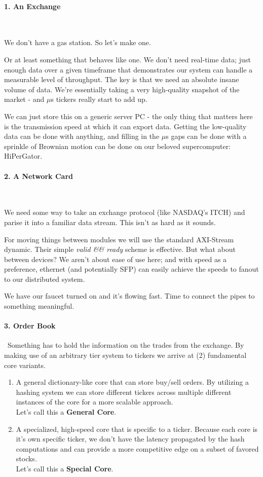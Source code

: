 \documentclass[12pt]{article}
\begin{document}
\paragraph {1. An Exchange}\

We don't have a gas station. So let's make one.

Or at least something that behaves like one. We don't need real-time data; just enough data over a given timeframe that demonstrates our system can handle a measurable level of throughput. The key is that we need an absolute insane volume of data. We're essentially taking a very high-quality snapshot of the market - and $\mu$s tickers really start to add up.

We can just store this on a generic server PC - the only thing that matters here is the transmission speed at which it can export data. 
Getting the low-quality data can be done with anything, and filling in the $\mu$s gaps can be done with a sprinkle of Brownian motion can be done on our
beloved supercomputer: HiPerGator.

\paragraph {2. A Network Card}\

We need some way to take an exchange protocol (like NASDAQ's ITCH) and parise it into a familiar data stream. This isn't as hard as it sounds.

For moving things between modules we will use the standard AXI-Stream dynamic. Their simple \emph{valid \&\& ready} scheme is effective.
But what about between devices? 
We aren't about ease of use here; and with speed as a preference, ethernet (and potentially SFP) can
easily achieve the speeds to fanout to our distributed system.

We have our faucet turned on and it's flowing fast. Time to connect the pipes to something meaningful.

\paragraph {3. Order Book}\ 
Something has to hold the information on the trades from the exchange.
By making use of an arbitrary tier system to tickers we arrive at (2) fundamental core variants.

\begin{enumerate}
  \item 
A general dictionary-like core that can store buy/sell orders. 
By utilizing a hashing system we can store different tickers across multiple 
different instances of the core for a more scalable approach.\\
Let's call this a \textbf{General Core}.

  \item 
A specialized, high-speed core that is specific to a ticker. 
Because each core is it's own specific ticker, we don't have the latency 
propagated by the hash computations and can provide a more competitive edge on a subset of favored stocks.\\
Let's call this a \textbf{Special Core}.

\end{enumerate}
\end{document}
